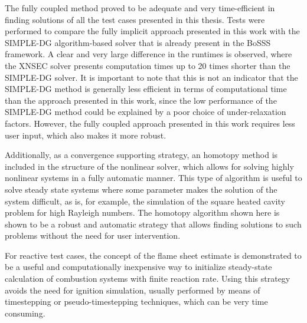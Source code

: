 The fully coupled method proved to be adequate and very time-efficient in finding solutions of all the test cases presented in this thesis. Tests were performed to compare the fully implicit approach presented in this work with the SIMPLE-DG algorithm-based solver that is already present in the BoSSS framework. A clear and very large difference in the runtimes is observed, where the XNSEC solver presents computation times up to 20 times shorter than the SIMPLE-DG solver. It is important to note that this is not an indicator that the SIMPLE-DG method is generally less efficient in terms of computational time than the approach presented in this work, since the low performance of the SIMPLE-DG method could be explained by a poor choice of under-relaxation factors. However, the fully coupled approach presented in this work requires less user input, which also makes it more robust.

Additionally, as a convergence supporting strategy, an homotopy method is included in the structure of the nonlinear solver, which allows for solving highly nonlinear systems in a fully automatic manner. This type of algorithm is useful to solve steady state systems where some parameter makes the solution of the system difficult, as is, for example, the simulation of the square heated cavity problem for high Rayleigh numbers. The homotopy algorithm shown here is shown to be a robust and automatic strategy that allows finding solutions to such problems without the need for user intervention.

For reactive test cases, the concept of the flame sheet estimate is demonstrated to be a useful and computationally inexpensive way to initialize steady-state calculation of combustion systems with finite reaction rate. Using this strategy avoids the need for ignition simulation, usually performed by means of timestepping or pseudo-timestepping techniques, which can be very time consuming.






